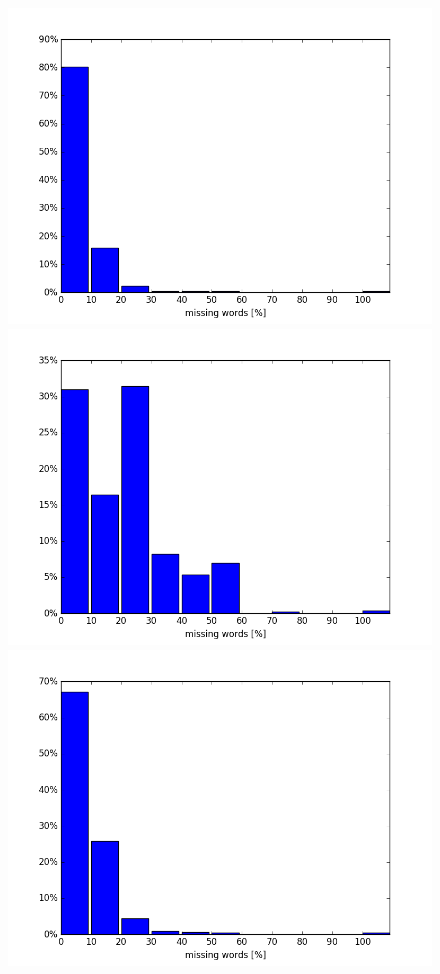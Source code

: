 \begin{figure}[H]
	\endminipage\hfill
	\includegraphics[width=\linewidth]{img/reddit_vocab_analyze_50k_perc.PNG}
	\centering
	\small
	\endminipage\hfill
	\includegraphics[width=\linewidth]{img/opus_vocab_analyze_50k_perc.PNG}
	\centering
	\small
	\endminipage\hfill
	\includegraphics[width=\linewidth]{img/reddit_vocab_analyze_25k_perc.PNG}

\end{figure}
